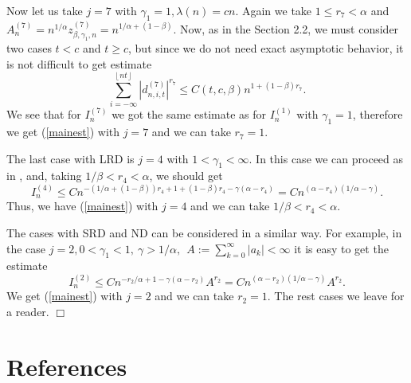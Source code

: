 \documentclass[12pt]{article}
\def\a{\alpha}
\def\b{\beta}
\def\g{\gamma}
\def\l{\lambda}
\newcommand{\sv}[1]{\left\lfloor #1 \right\rfloor}
\newcommand{\halmos}{\vspace{3mm} \hfill \mbox{$\Box$}\\[2mm]}
\theoremstyle{plain}
\theoremstyle{definition}
\begin{document}
Now  let us take $j=7$ with $\g_1=1, \l (n)=cn$. Again we take $1\le r_7<\a$ and $A_n^{(7)}=n^{1/\a}z_{\b, \g_1, n}^{(7)}=n^{1/\a +(1-\b)}$. Now, as in the Section 2.2, we must consider two cases $t<c$ and $t\ge c$, but since  we do not  need exact asymptotic behavior, it is not difficult to get  estimate
$$
\sum_{i=-\infty}^{\sv{nt}}|d_{n, i, t}^{(7)}|^{r_7}\le C(t, c, \b) n^{1+(1-\b)r_7}.
$$
We see that for $I_n^{(7)}$ we got the same estimate as for $I_n^{(1)}$ with $\g_1=1$, therefore we get (\ref{mainest}) with $j=7$ and we can take $r_7=1$.

The last case with LRD is $j=4$ with $1<\g_1<\infty$. In this case we can proceed as in \cite{PaulDam5}, and, taking $1/\b<r_4<\a$, we should get
$$
I_n^{(4)}\le Cn^{-(1/\a +(1-\b))r_4+1+(1-\b)r_4-\g(\a-r_4) }=Cn^{(\a-r_4)(1/\a-\g)}.
$$
Thus, we have (\ref{mainest}) with $j=4$ and we can take $1/\b<r_4<\a$.

The cases with SRD and ND can be considered in a similar way. For example, in the case $j=2, 0<\g_1<1, \ \g>1/\a, \ \ A:=\sum_{k=0}^\infty |a_k|<\infty$ it is easy to get the estimate
$$
I_n^{(2)}\le Cn^{-r_2/\a +1-\g(\a-r_2) } A^{r_2}=Cn^{(\a-r_2)(1/\a-\g)} A^{r_2}.
$$
We get (\ref{mainest}) with $j=2$ and we can take $r_2=1$. The rest cases we leave  for a reader.
\halmos


\section*{References}



\end{document}
